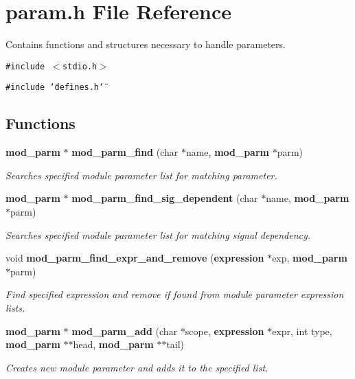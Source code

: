 \section{param.h File Reference}
\label{param_8h}
Contains functions and structures necessary to handle parameters.  


{\tt \#include $<$stdio.h$>$}\par
{\tt \#include \char`\"{}defines.h\char`\"{}}\par
\subsection*{Functions}
\begin{CompactItemize}
\item 
{\bf mod\_\-parm} $\ast$ {\bf mod\_\-parm\_\-find} (char $\ast$name, {\bf mod\_\-parm} $\ast$parm)
\begin{CompactList}\small\item\em Searches specified module parameter list for matching parameter. \item\end{CompactList}\item 
{\bf mod\_\-parm} $\ast$ {\bf mod\_\-parm\_\-find\_\-sig\_\-dependent} (char $\ast$name, {\bf mod\_\-parm} $\ast$parm)
\begin{CompactList}\small\item\em Searches specified module parameter list for matching signal dependency. \item\end{CompactList}\item 
void {\bf mod\_\-parm\_\-find\_\-expr\_\-and\_\-remove} ({\bf expression} $\ast$exp, {\bf mod\_\-parm} $\ast$parm)
\begin{CompactList}\small\item\em Find specified expression and remove if found from module parameter expression lists. \item\end{CompactList}\item 
{\bf mod\_\-parm} $\ast$ {\bf mod\_\-parm\_\-add} (char $\ast$scope, {\bf expression} $\ast$expr, int type, {\bf mod\_\-parm} $\ast$$\ast$head, {\bf mod\_\-parm} $\ast$$\ast$tail)
\begin{CompactList}\small\item\em Creates new module parameter and adds it to the specified list. \item\end{CompactList}\item 

\end{CompactItemize}
